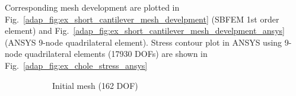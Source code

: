 Corresponding mesh development are plotted in Fig.~\ref{adap_fig:ex_short_cantilever_mesh_develpment} (SBFEM 1\textup{st} order element) and Fig.~\ref{adap_fig:ex_short_cantilever_mesh_develpment_ansys} (ANSYS 9-node quadrilateral element).
Stress contour plot in ANSYS using 9-node quadrilateral elements (17930 DOFs) are shown in Fig.~\ref{adap_fig:ex_chole_stress_ansys}
\begin{figure}[h!]
\centering
    \begin{subfigure}[b]{0.4\linewidth}
        \centering
        \caption{Initial mesh (162 DOF)}
    \end{subfigure}
    \begin{subfigure}[b]{0.4\linewidth}
        \centering
        \scalebox{0.25}{
}
\end{subfigure}
\end{figure}
